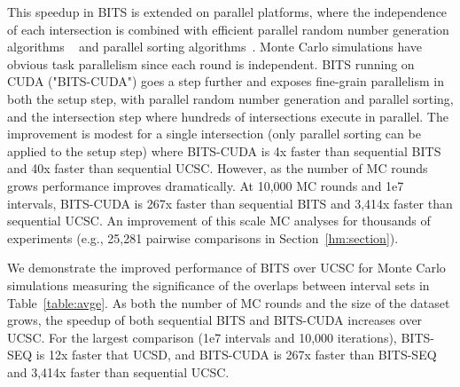\documentclass{bioinfo}
\begin{document}
This speedup in BITS is extended on parallel platforms, where the independence
of each intersection is combined with efficient parallel random number
generation algorithms ~\citep{tzeng2008} and parallel sorting
algorithms~\citep{merrill2011,satish2009}.  Monte Carlo simulations have obvious
task parallelism since each round is independent.  BITS running on CUDA 
("BITS-CUDA") goes a step further and exposes fine-grain parallelism in both the 
setup step, with
parallel random number generation and parallel sorting, and the intersection
step where hundreds of intersections execute in parallel.  The improvement is
modest for a single intersection (only parallel sorting can be applied to the
setup step) where BITS-CUDA is 4x faster than sequential BITS and 40x faster
than sequential UCSC.  However, as the number of MC rounds grows performance
improves dramatically.  At 10,000 MC rounds and 1e7 intervals, BITS-CUDA is 267x
faster than sequential BITS and 3,414x faster than sequential UCSC.  An
improvement of this scale MC analyses for thousands of experiments 
(e.g., 25,281 pairwise comparisons in Section~\ref{hm:section}).

We demonstrate the improved performance of BITS over UCSC for Monte Carlo
simulations measuring the significance of the overlaps between interval sets in
Table~\ref{table:avge}.  As both the number of MC rounds and the size of
the dataset grows, the speedup of both sequential BITS and BITS-CUDA increases
over UCSC.  For the largest comparison (1e7 intervals and 10,000 iterations),
BITS-SEQ is 12x faster that UCSD, and BITS-CUDA is 267x
faster than BITS-SEQ and 3,414x faster than sequential UCSC.

\end{document}
